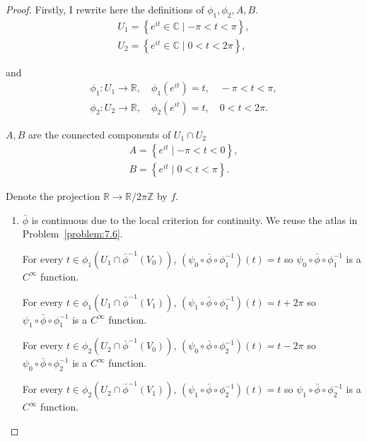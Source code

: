 \begin{proof}
    Firstly, I rewrite here the definitions of \( \phi_{1}, \phi_{2}, A, B \).
    \[
        \begin{split}
            U_{1} = \left\{ e^{it} \in \mathbb{C} \mid -\pi < t < \pi \right\}, \\
            U_{2} = \left\{ e^{it} \in \mathbb{C} \mid 0 < t < 2\pi \right\},
        \end{split}
    \]

    and
    \[
        \begin{split}
            \phi_{1}: U_{1} \to \mathbb{R}, \quad \phi_{1}(e^{it}) = t, \quad -\pi < t < \pi, \\
            \phi_{2}: U_{2} \to \mathbb{R}, \quad \phi_{2}(e^{it}) = t, \quad 0 < t < 2\pi.
        \end{split}
    \]

    \( A, B \) are the connected components of \( U_{1} \cap U_{2} \)
    \[
        \begin{split}
            A = \left\{ e^{it} \mid -\pi < t < 0 \right\}, \\
            B = \left\{ e^{it} \mid 0 < t < \pi \right\}.
        \end{split}
    \]

    Denote the projection \( \mathbb{R} \to \mathbb{R}/2\pi\mathbb{Z} \) by \( f \).

    \begin{enumerate}[label={(\alph*)},leftmargin=*]
        \item \( \bar{\phi} \) is continuous due to the local criterion for continuity. We reuse the atlas in Problem~\ref{problem:7.6}.

              For every \( t \in \phi_{1}(U_{1} \cap \bar{\phi}^{-1}(V_{0})) \), \( (\psi_{0} \circ \bar{\phi} \circ \phi_{1}^{-1})(t) = t \) so \( \psi_{0} \circ \bar{\phi} \circ \phi_{1}^{-1} \) is a \( C^{\infty} \) function.

              For every \( t \in \phi_{1}(U_{1} \cap \bar{\phi}^{-1}(V_{1})) \), \( (\psi_{1} \circ \bar{\phi} \circ \phi_{1}^{-1})(t) = t + 2\pi \) so \( \psi_{1} \circ \bar{\phi} \circ \phi_{1}^{-1} \) is a \( C^{\infty} \) function.

              For every \( t \in \phi_{2}(U_{2} \cap \bar{\phi}^{-1}(V_{0})) \), \( (\psi_{0} \circ \bar{\phi} \circ \phi_{2}^{-1})(t) = t - 2\pi \) so \( \psi_{0} \circ \bar{\phi} \circ \phi_{2}^{-1} \) is a \( C^{\infty} \) function.

              For every \( t \in \phi_{2}(U_{2} \cap \bar{\phi}^{-1}(V_{1})) \), \( (\psi_{1} \circ \bar{\phi} \circ \phi_{2}^{-1})(t) = t \) so \( \psi_{1} \circ \bar{\phi} \circ \phi_{2}^{-1} \) is a \( C^{\infty} \) function.


\end{enumerate}
\end{proof}
